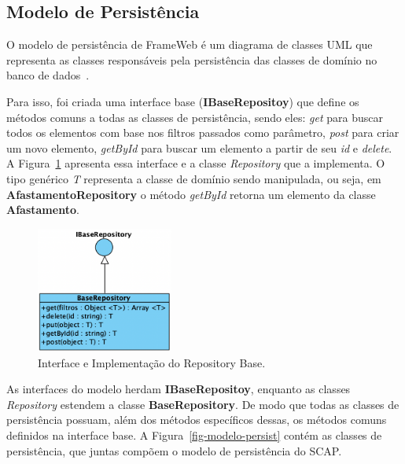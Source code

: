 \FloatBarrier


\subsection{Modelo de Persistência}
\label{subsec-frameweb-persistencia}

O modelo de persistência de FrameWeb é um diagrama de classes UML que representa
as classes responsáveis pela persistência das classes de domínio no banco de dados~\cite{souza:2007}.

Para isso, foi criada uma interface base (\textbf{IBaseRepositoy}) que define os métodos comuns a todas as classes de persistência,
sendo eles: \textit{get} para buscar todos os elementos com base nos filtros passados como parâmetro,
\textit{post} para criar um novo elemento, \textit{getById} para buscar um elemento a partir de seu
\textit{id} e \textit{delete}. A Figura~\ref{fig-modelo-persist-base} apresenta essa interface e a
classe \textit{Repository} que a implementa. O tipo genérico \textit{T} representa a classe de domínio
sendo manipulada, ou seja, em \textbf{AfastamentoRepository} o método \textit{getById}
retorna um elemento da classe \textbf{Afastamento}.


\begin{figure}[h!]
    \centering
    \includegraphics[width=0.4\textwidth]{figuras/fig-modelo-persist-base.png}
    \caption{Interface e Implementação do Repository Base.}
    \label{fig-modelo-persist-base}
\end{figure}


As interfaces do modelo herdam \textbf{IBaseRepositoy}, enquanto as classes \textit{Repository} estendem a
classe \textbf{BaseRepository}. De modo que todas as classes de persistência possuam, além dos métodos
específicos dessas, os métodos comuns definidos na interface base. A Figura~\ref{fig-modelo-persist}
contém as classes de persistência, que juntas compõem o modelo de persistência do SCAP.

